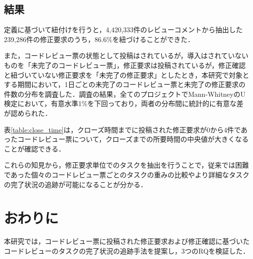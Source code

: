 \documentclass[twocolumn]{jarticle} %
\begin{document}
\subsection{結果}
定義に基づいて紐付けを行うと，4,420,333件のレビューコメントから抽出した239,286件の修正要求のうち，86.6\%を紐づけることができた．

また，コードレビュー票の状態として投稿はされているが，導入はされていないものを「未完了のコードレビュー票」，修正要求は投稿されているが，修正確認と紐づいていない修正要求を「未完了の修正要求」としたとき，本研究で対象とする期間において，1日ごとの未完了のコードレビュー票と未完了の修正要求の件数の分布を調査した．調査の結果，全てのプロジェクトでMann-WhitneyのU検定において，有意水準1\%を下回っており，両者の分布間に統計的に有意な差が認められた．

表\ref{table:close_time}は，クローズ時間までに投稿された修正要求が0から4件であったコードレビュー票について，クローズまでの所要時間の中央値が大きくなることが確認できる．

これらの知見から，修正要求単位でのタスクを抽出を行うことで，従来では困難であった個々のコードレビュー票ごとのタスクの重みの比較やより詳細なタスクの完了状況の追跡が可能になることが分かる．

\begin{table}[t]
\centering
  \caption{修正要求の件数ごとのコードレビュー票のクローズ時間}
  \label{table:close_time}
\end{table}

\section{おわりに}\label{sec:conclusion}

本研究では，コードレビュー票に投稿された修正要求および修正確認に基づいたコードレビューのタスクの完了状況の追跡手法を提案し，3つのRQを検証した．
\end{document}
